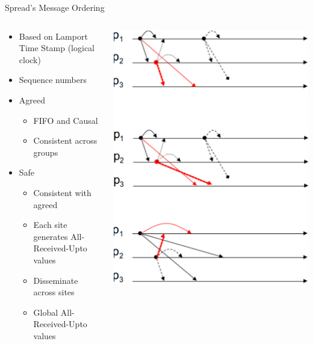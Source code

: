 \documentclass[pdftex]{beamer}
\begin{document}
\begin{frame}{Spread's Message Ordering}
\begin{columns}
\begin{column}{.5\textwidth}

\begin{itemize}
	\item Based on Lamport Time Stamp (logical clock)
	\item Sequence numbers
	\item Agreed
	\begin{itemize}
		\item FIFO and Causal
		\item Consistent across groups
	\end{itemize}
	\item Safe
	\begin{itemize}
		\item Consistent with agreed
		\item Each site generates All-Received-Upto values
		\item Disseminate across sites
		\item Global All-Received-Upto values
	\end{itemize}
\end{itemize}
\end{column}
	
\begin{column}{.5\textwidth}
\includegraphics[width=\textwidth]{message_ordering}
\end{column}

\end{columns}
\end{frame}
\end{document}
